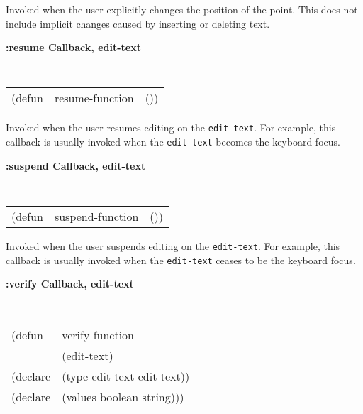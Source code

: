 \begin{flushright} \parbox[t]{6.125in}{
Invoked when the user explicitly changes the position of the
point.
This does not include implicit changes caused by inserting or deleting text.

}\end{flushright}


{\samepage
{\large {\bf :resume \hfill Callback, edit-text}} 
\begin{flushright} 
\parbox[t]{6.125in}{
\tt
\begin{tabular}{lll}
\raggedright
(defun & resume-function & ())
\end{tabular}
\rm

}\end{flushright}}

\begin{flushright} \parbox[t]{6.125in}{
Invoked when the user resumes editing on the {\tt edit-text}. For
example, this callback is usually invoked when the {\tt edit-text} becomes
the keyboard focus. 

}\end{flushright}

{\samepage
{\large {\bf :suspend \hfill Callback, edit-text}} 
\begin{flushright} 
\parbox[t]{6.125in}{
\tt
\begin{tabular}{lll}
\raggedright
(defun & suspend-function & ())
\end{tabular}
\rm

}\end{flushright}}

\begin{flushright} \parbox[t]{6.125in}{
Invoked when the user suspends editing on the {\tt edit-text}. For
example, this callback is usually invoked when the {\tt edit-text} ceases
to be the keyboard focus. 

}\end{flushright}


{\samepage
{\large {\bf :verify \hfill Callback, edit-text}} 
\begin{flushright} 
\parbox[t]{6.125in}{
\tt
\begin{tabular}{lll}
\raggedright
(defun & verify-function \\
& (edit-text)\\
(declare & (type  edit-text  edit-text))\\
(declare   & (values boolean string)))
\end{tabular}
\rm

}\end{flushright}}

